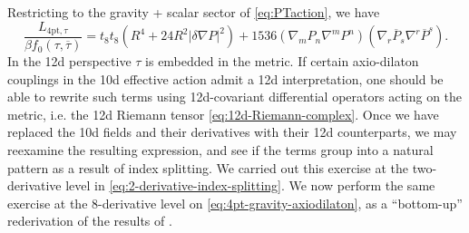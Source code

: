 Restricting to the gravity + scalar sector of \eqref{eq:PTaction}, we have
\begin{equation}
\frac{L_{\text{4pt},\tau}}{\beta f_0(\tau,\overline{\tau})} = t_8t_8
(R^4 + 24 R^2 |\delta \nabla P|^2) + 1536 (\nabla_m P_n \nabla^m P^n)(\nabla_r \overline{P}_s \nabla^r \overline{P}^s).
\label{eq:4pt-gravity-axiodilaton}
\end{equation}
In the 12d perspective $\tau$ is embedded in the metric.
If certain axio-dilaton couplings in the 10d effective action admit a 12d interpretation, one should be able to rewrite such terms using 12d-covariant differential operators acting on the metric, i.e. the 12d Riemann tensor \eqref{eq:12d-Riemann-complex}. 
Once we have replaced the 10d fields and their derivatives with their 12d counterparts, we may reexamine the resulting expression, and see if the terms group into a natural pattern as a result of index splitting.
We carried out this exercise at the two-derivative level in \eqref{eq:2-derivative-index-splitting}. We now perform the same exercise at the 8-derivative level on \eqref{eq:4pt-gravity-axiodilaton}, as a ``bottom-up'' rederivation of the results of \cite{Minasian:2015bxa}.

